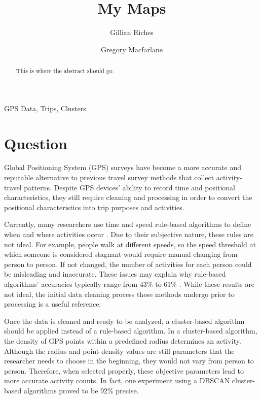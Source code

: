 \documentclass[3p, authoryear]{elsarticle} %
\begin{document}
\begin{frontmatter}

  \title{My Maps}
    \author[Brigham Young University]{Gillian Riches}
    \author[Brigham Young University]{Gregory Macfarlane}
      \address[Brigham Young University]{Civil and Environmental Engineering Department, 232 Engineering Building, Provo, Utah 84602}
  
  \begin{abstract}
  This is where the abstract should go.
  \end{abstract}
   \begin{keyword} GPS Data, Trips, Clusters\end{keyword}
 \end{frontmatter}

\hypertarget{question}{%
\section{Question}\label{question}}

Global Positioning System (GPS) surveys have become a more accurate and reputable alternative to previous travel survey methods that collect activity-travel patterns. Despite GPS devices' ability to record time and positional characteristics, they still require cleaning and processing in order to convert the positional characteristics into trip purposes and activities.

Currently, many researchers use time and speed rule-based algorithms to define when and where activities occur \citep{reviewOfMethods2014}. Due to their subjective nature, these rules are not ideal. For example, people walk at different speeds, so the speed threshold at which someone is considered stagnant would require manual changing from person to person. If not changed, the number of activities for each person could be misleading and inaccurate. These issues may explain why rule-based algorithms' accuracies typically range from 43\% to 61\% \citep{reviewOfMethods2014}. While these results are not ideal, the initial data cleaning process these methods undergo prior to processing is a useful reference.

Once the data is cleaned and ready to be analyzed, a cluster-based algorithm should be applied instead of a rule-based algorithm. In a cluster-based algorithm, the density of GPS points within a predefined radius determines an activity. Although the radius and point density values are still parameters that the researcher needs to choose in the beginning, they would not vary from person to person. Therefore, when selected properly, these objective parameters lead to more accurate activity counts. In fact, one experiment \citep{DBAlgorithm2017} using a DBSCAN cluster-based algorithms proved to be 92\% precise.
\end{document}
